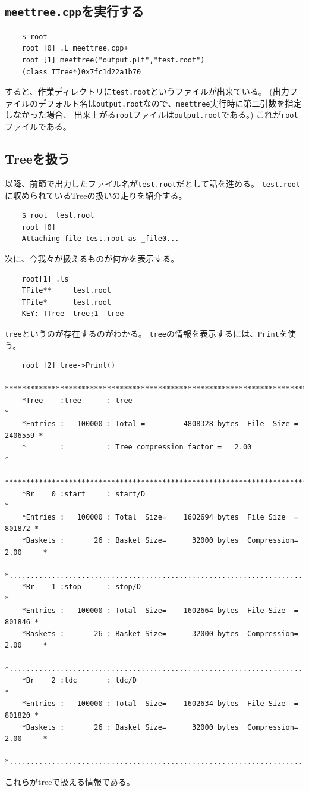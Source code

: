 \documentclass{jarticle}
\begin{document}
  \subsection{\texttt{meettree.cpp}を実行する}
\begin{verbatim}
	$ root
	root [0] .L meettree.cpp+
	root [1] meettree("output.plt","test.root")
	(class TTree*)0x7fc1d22a1b70
\end{verbatim}
すると、作業ディレクトリに\verb|test.root|というファイルが出来ている。
(出力ファイルのデフォルト名は\verb|output.root|なので、\verb|meettree|実行時に第二引数を指定しなかった場合、
出来上がる\verb|root|ファイルは\verb|output.root|である。)
これが\verb|root|ファイルである。

  \subsection{Treeを扱う}
  以降、前節で出力したファイル名が\verb|test.root|だとして話を進める。
  \verb|test.root|に収められているTreeの扱いの走りを紹介する。
\begin{verbatim}
	$ root  test.root 
	root [0] 
	Attaching file test.root as _file0...
\end{verbatim}
次に、今我々が扱えるものが何かを表示する。
\begin{verbatim}
	root[1] .ls
	TFile**		test.root
	TFile*		test.root
	KEY: TTree	tree;1	tree
\end{verbatim}
\verb|tree|というのが存在するのがわかる。
\verb|tree|の情報を表示するには、\verb|Print|を使う。
\begin{verbatim}
	root [2] tree->Print()
	******************************************************************************
	*Tree    :tree      : tree                                                   *
	*Entries :   100000 : Total =         4808328 bytes  File  Size =    2406559 *
	*        :          : Tree compression factor =   2.00                       *
	******************************************************************************
	*Br    0 :start     : start/D                                                *
	*Entries :   100000 : Total  Size=    1602694 bytes  File Size  =     801872 *
	*Baskets :       26 : Basket Size=      32000 bytes  Compression=   2.00     *
	*............................................................................*
	*Br    1 :stop      : stop/D                                                 *
	*Entries :   100000 : Total  Size=    1602664 bytes  File Size  =     801846 *
	*Baskets :       26 : Basket Size=      32000 bytes  Compression=   2.00     *
	*............................................................................*
	*Br    2 :tdc       : tdc/D                                                  *
	*Entries :   100000 : Total  Size=    1602634 bytes  File Size  =     801820 *
	*Baskets :       26 : Basket Size=      32000 bytes  Compression=   2.00     *
	*............................................................................*
\end{verbatim}
これらがtreeで扱える情報である。
\end{document}
